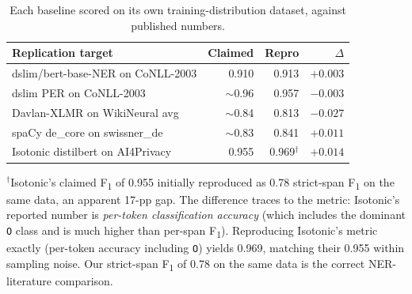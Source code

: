 \documentclass[sigconf,nonacm]{acmart}
\begin{document}
\begin{table}[!htbp]
\centering
\caption{Each baseline scored on its own training-distribution
dataset, against published numbers.}
\label{tab:replication}
\small
\begin{tabular}{l r r r}
\toprule
Replication target                                & Claimed       & Repro             & $\Delta$ \\
\midrule
dslim/bert-base-NER on CoNLL-2003                 & 0.910         & 0.913             & $+0.003$ \\
dslim PER on CoNLL-2003                           & ${\sim}$0.96  & 0.957             & $-0.003$ \\
Davlan-XLMR on WikiNeural avg                     & ${\sim}$0.84  & 0.813             & $-0.027$ \\
spaCy de\_core on swissner\_de                    & ${\sim}$0.83  & 0.841             & $+0.011$ \\
Isotonic distilbert on AI4Privacy                 & 0.955         & 0.969$^\dagger$   & $+0.014$ \\
\bottomrule
\end{tabular}
\end{table}

\noindent$^\dagger$Isotonic's claimed
F\textsubscript{1} of 0.955 initially reproduced as 0.78 strict-span
F\textsubscript{1} on the same data, an apparent 17-pp gap. The
difference traces to the metric: Isotonic's reported number is
\emph{per-token classification accuracy} (which includes the dominant
\texttt{O} class and is much higher than per-span F\textsubscript{1}).
Reproducing Isotonic's metric exactly (per-token accuracy including
\texttt{O}) yields 0.969, matching their 0.955 within sampling noise.
Our strict-span F\textsubscript{1} of 0.78 on the same data is the
correct NER-literature comparison.
\end{document}
